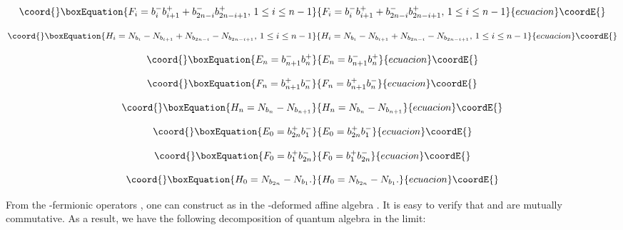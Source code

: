 \documentclass[a4paper,12pt,thmsa]{article}
\begin{document}
\begin{equation}\coord{}\boxEquation{
F_i=b_i^{-}b_{i+1}^{+}+b_{2n-i}^{-}b_{2n-i+1}^{+},\, 1\leq i\leq
n-1
}{
F_i=b_i^{-}b_{i+1}^{+}+b_{2n-i}^{-}b_{2n-i+1}^{+},\, 1\leq i\leq
n-1
}{ecuacion}\coordE{}\end{equation}

\begin{equation}\coord{}\boxEquation{
H_i=N_{b_i}-N_{b_{i+1}}+N_{b_{2n-i}}-N_{b_{2n-i+1}},\, 1\leq i\leq
n-1
}{
H_i=N_{b_i}-N_{b_{i+1}}+N_{b_{2n-i}}-N_{b_{2n-i+1}},\, 1\leq i\leq
n-1
}{ecuacion}\coordE{}\end{equation}

\begin{equation}\coord{}\boxEquation{
E_{n}=b_{n+1}^{-}b_{n}^{+}
}{
E_{n}=b_{n+1}^{-}b_{n}^{+}
}{ecuacion}\coordE{}\end{equation}

\begin{equation}\coord{}\boxEquation{
F_{n}=b_{n+1}^{+}b_{n}^{-}
}{
F_{n}=b_{n+1}^{+}b_{n}^{-}
}{ecuacion}\coordE{}\end{equation}

\begin{equation}\coord{}\boxEquation{
H_{n}=N_{b_{n}}-N_{b_{n+1}}
}{
H_{n}=N_{b_{n}}-N_{b_{n+1}}
}{ecuacion}\coordE{}\end{equation}

\begin{equation}\coord{}\boxEquation{
E_{0}=b_{2n}^{+}b_{1}^{-}
}{
E_{0}=b_{2n}^{+}b_{1}^{-}
}{ecuacion}\coordE{}\end{equation}

\begin{equation}\coord{}\boxEquation{
F_{0}=b_{1}^{+}b_{2n}^{-}
}{
F_{0}=b_{1}^{+}b_{2n}^{-}
}{ecuacion}\coordE{}\end{equation}

\begin{equation}\coord{}\boxEquation{
H_0=N_{b_{2n}}-N_{b_1}.
}{
H_0=N_{b_{2n}}-N_{b_1}.
}{ecuacion}\coordE{}\end{equation}

From the \coordHE{}-fermionic operators \coordHE{}, one can construct as in \coordHE{} the \coordHE{}-deformed affine algebra \coordHE{}. It is easy to verify that \coordHE{} and \coordHE{} are mutually commutative. As a
result, we have the following decomposition of quantum algebra \coordHE{} in the \coordHE{} limit:
\end{document}
